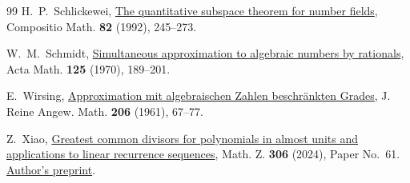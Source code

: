 \documentclass[11pt,a4paper,reqno]{amsart}
\theoremstyle{definition}
\theoremstyle{remark}
\numberwithin{equation}{section}
\begin{document}
\begin{thebibliography}{99}
 H.~P.~Schlickewei, \href{https://www.numdam.org/item/CM_1992__82_3_245_0/}{The quantitative subspace theorem for number fields}, Compositio Math. \textbf{82} (1992), 245--273.

 W.~M.~Schmidt, \href{https://doi.org/10.1007/BF02392334}{Simultaneous approximation to algebraic numbers by rationals}, Acta Math. \textbf{125} (1970), 189--201.

 E.~Wirsing, \href{https://doi.org/10.1515/crll.1961.206.67}{Approximation mit algebraischen Zahlen beschr\"ankten Grades}, J. Reine Angew. Math. \textbf{206} (1961), 67--77.

 Z.~Xiao, \href{https://doi.org/10.1007/s00209-024-03453-4}{Greatest common divisors for polynomials in almost units and applications to linear recurrence sequences}, Math. Z. \textbf{306} (2024), Paper No.~61. \href{https://arxiv.org/abs/2110.01751v3}{Author's preprint}.

\end{thebibliography}
\end{document}
